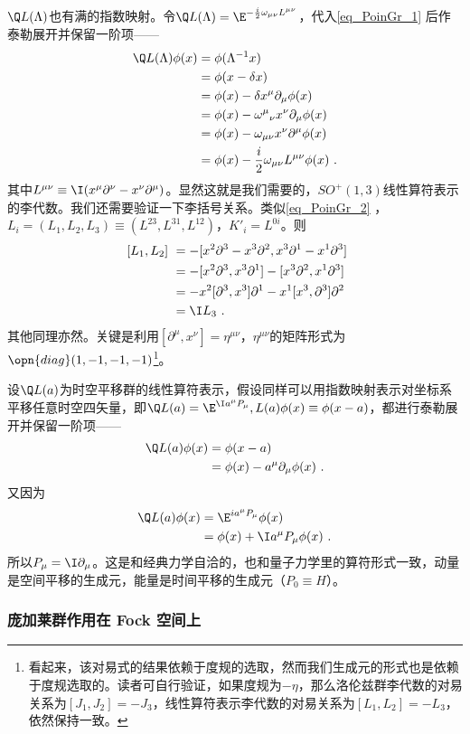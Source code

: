 $\Q L(\Lambda)$也有满的指数映射。令$\Q L(\Lambda)=\E^{-\frac{i}{2} \omega_{\mu \nu} L^{\mu \nu}}$，代入\autoref{eq_PoinGr_1} 后作泰勒展开并保留一阶项——
\begin{equation}
\begin{aligned}
\Q L(\Lambda)\phi(x)&=\phi(\Lambda^{-1}x)\\
&=\phi(x-\delta x)\\
&= \phi(x)-\delta x^{\mu} \partial_{\mu} \phi(x) \\
&= \phi(x)-\omega^{\mu}{ }_{\nu} x^{\nu} \partial_{\mu} \phi(x) \\
&=\phi(x)-\omega_{\mu \nu} x^{\nu} \partial^{\mu} \phi(x) \\
&= \phi(x)-\frac{i}{2} \omega_{\mu \nu} L^{\mu \nu} \phi(x)~.
\end{aligned}
\end{equation}
其中$L^{\mu\nu}\equiv\I(x^{\mu}\partial^{\nu}-x^{\nu}\partial^{\mu})$。显然这就是我们需要的，$SO^+(1,3)$线性算符表示的李代数。我们还需要验证一下李括号关系。类似\autoref{eq_PoinGr_2}  ，$L_i=(L_1,L_2,L_3)\equiv(L^{23},L^{31},L^{12})$，$K'_i=L^{0i}$。则
\begin{equation}
\begin{aligned}
~[L_1,L_2]~&=-[x^{2}\partial^{3}-x^{3}\partial^{2},x^{3}\partial^{1}-x^{1}\partial^{3}]\\
&=-[x^2\partial^3,x^3\partial^1]-[x^3\partial^2,x^1\partial^3]\\
&=-x^2[\partial^3,x^3]\partial^1-x^1[x^3,\partial^3]\partial^2\\
&=\I L_3~.
\end{aligned}
\end{equation}
其他同理亦然。关键是利用$[\partial^{\mu},x^{\nu}]=\eta^{\mu\nu}$，$\eta^{\mu\nu}$的矩阵形式为$\opn{diag}(1,-1,-1,-1)$\footnote{看起来，该对易式的结果依赖于度规的选取，然而我们生成元的形式也是依赖于度规选取的。读者可自行验证，如果度规为$-\eta$，那么洛伦兹群李代数的对易关系为$[J_1,J_2]=-J_3$，线性算符表示李代数的对易关系为$[L_1,L_2]=-L_3$，依然保持一致。}。

设$\Q L(a)$为时空平移群的线性算符表示，假设同样可以用指数映射表示对坐标系平移任意时空四矢量，即$\Q L(a)=\E^{\I a^{\mu}P_{\mu}},L(a)\phi(x)\equiv \phi(x-a)$，都进行泰勒展开并保留一阶项——
\begin{equation}\begin{aligned}
\Q L(a)\phi(x)& =\phi(x-a) \\
&=\phi(x)-a^{\mu}\partial_{\mu}\phi(x)~.
\end{aligned}\end{equation}
又因为
\begin{equation}
\begin{aligned}
\Q L(a)\phi(x)& = \E^{ia^{\mu}P_{\mu}}\phi(x) \\
&=\phi(x)+\I a^{\mu}P_{\mu}\phi(x)~.
\end{aligned}
\end{equation}
所以$P_{\mu}=\I\partial_{\mu}$。这是和经典力学自洽的，也和量子力学里的算符形式一致，动量是空间平移的生成元，能量是时间平移的生成元（$P_0\equiv H$）。





\subsubsection{庞加莱群作用在 Fock 空间上}
